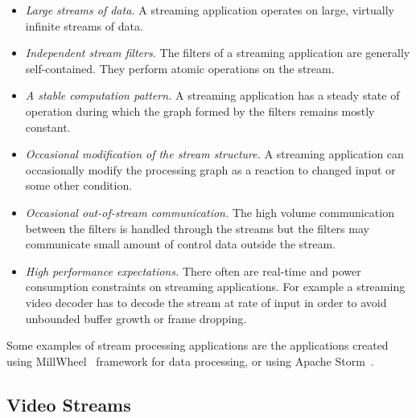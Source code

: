 \begin{itemize}
    \item \textit{Large streams of data.} A streaming application operates on large, virtually infinite streams of data.
    \item \textit{Independent stream filters.} The filters of a streaming application are generally self-contained. They perform atomic operations on the stream.
    \item \textit{A stable computation pattern.} A streaming application has a steady state of operation during which the graph formed by the filters remains mostly constant.
    \item \textit{Occasional modification of the stream structure.} A streaming application can occasionally modify the processing graph as a reaction to changed input or some other condition.
    \item \textit{Occasional out-of-stream communication.} The high volume communication between the filters is handled through the streams but the filters may communicate small amount of control data outside the stream.
    \item \textit{High performance expectations.} There often are real-time and power consumption constraints on streaming applications. For example a streaming video decoder has to decode the stream at rate of input in order to avoid unbounded buffer growth or frame dropping.
\end{itemize}

Some examples of stream processing applications are the applications created using MillWheel~\cite{tyler2013millwheel} framework for data processing, or using Apache Storm~\cite{storm2014storm}. \\



\subsection{Video Streams}
\label{subsec:video-streams}
